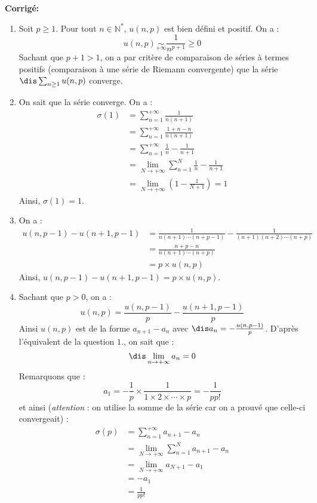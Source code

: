 \documentclass[a4paper,twoside,french,10pt]{VcCours}
\newcommand{\corr}{\textbf{Corrigé:}}
\begin{document}
\corr \begin{enumerate}
\item Soit $p \geq 1$. Pour tout $n \in \mathbb{N}^*$, $u(n,p)$ est bien défini et positif. On a :
$$u(n,p) \underset{+\infty}{\sim} \frac{1}{n^{p+1}} \geq 0$$
Sachant que $p+1>1$, on a par critère de comparaison de séries à termes positifs (comparaison à une série de Riemann convergente) que la s\'erie $\dis \sum_{n \geq 1} u(n,p)$ converge.

\item  On sait que la s\'erie converge. On a : 
\begin{align*}
\sigma (1)& =\sum_{n=1}^{+\infty }\frac{1}{n(n+1)} \\
& =\sum_{n=1}^{+\infty }\frac{1+n-n}{n(n+1)} \\
& =\sum_{n=1}^{+\infty }\frac{1}{n}-\frac{1}{n+1} \\
& = \lim_{N \rightarrow + \infty} \sum_{n=1}^{N}\frac{1}{n}-\frac{1}{n+1} \\
& =\lim_{N \rightarrow +\infty }\left(1- \frac{1}{N+1}\right) =1 
\end{align*}
Ainsi, $\sigma(1)=1$.
\item On a :
\begin{align*}
u(n,p-1)-u(n+1,p-1) & =\frac{1}{n(n+1)\cdots (n+p-1)}-\frac{1}{(n+1)(n+2)\cdots
(n+p)} \\
& =\frac{n+p-n}{n(n+1)\cdots (n+p)} \\
& =p \times u(n,p) 
\end{align*}
Ainsi, $u(n,p-1)-u(n+1,p-1)=p \times u(n,p)$.
\item Sachant que $p>0$, on a :
\[
u(n,p)=\frac{u(n,p-1)}{p}-\frac{u(n+1,p-1)}{p} 
\]
Ainsi $u(n,p)$ est de la forme $a_{n+1}-a_n$ avec $ \dis a_n=-\frac{u(n,p-1)}{p}$. D'apr\`es l'\'equivalent de la question $1.$,  on sait que :
$$\dis \lim_{n \rightarrow + \infty} a_{n}=0$$
Remarquons que : 
$$a_{1}=-\frac{1}{p} \times \frac{1}{1 \times 2 \times \cdots \times p}=-\frac{1}{pp!}$$ 
et ainsi (\textit{attention} : on utilise la somme de la série car on a prouvé que celle-ci convergeait) :
\begin{align*}
\sigma(p) & = \sum_{n=1}^{+ \infty} a_{n+1}-a_n \\
& = \lim_{N \rightarrow + \infty}  \sum_{n=1}^{N} a_{n+1}-a_n \\
& = \lim_{N \rightarrow + \infty} a_{N+1} - a_1 \\
& = - a_1 \\
& = \frac{1}{pp!} 
\end{align*}
\end{enumerate}
\end{document}
